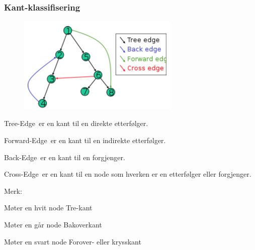 \documentclass[12pt]{report}
\begin{document}
\par


\vspace{\baselineskip}
\subsubsection*{Kant-klassifisering}



\begin{figure}[H]
\advance\leftskip 3.92in		\includegraphics[width=3.04in,height=1.83in]{./media/image69.png}
\end{figure}



Tree-Edge er en kant til en direkte etterfølger.\par

Forward-Edge er en kant til en indirekte etterfølger.\par

Back-Edge er en kant til en forgjenger.\par

Cross-Edge er en kant til en node som hverken er en etterfølger eller forgjenger.\par


\vspace{\baselineskip}
Merk:\par

	\item Møter en hvit node  Tre-kant\par

	\item Møter en går node  Bakoverkant\par

	\item Møter en svart node  Forover- eller krysskant\par
\end{document}
